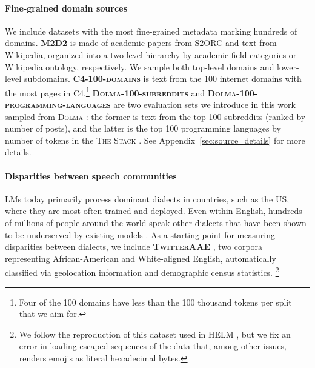 \paragraph{Fine-grained domain sources} We include datasets with the most fine-grained metadata marking hundreds of domains.
\textbf{\textsc{M2D2}} \citep{reid-etal-2022-m2d2} is made of academic papers from S2ORC \citep{lo-etal-2020-s2orc} and text from Wikipedia, organized into a two-level hierarchy by academic field categories or Wikipedia ontology, respectively. We sample both top-level domains and lower-level subdomains. 
\textbf{\textsc{C4-100-domains}} \citep{chronopoulou-etal-2022-efficient} is text from the 100 internet domains with the most pages in \textsc{C4}.\footnote{Four of the 100 domains have less than the 100 thousand tokens per split that we aim for.}
\textbf{\textsc{Dolma-100-subreddits}} and \textbf{\textsc{Dolma-100-programming-languages}} are two evaluation sets we introduce in this work sampled from \textsc{Dolma} \citep{dolma}: the former is text from the top 100 subreddits (ranked by number of posts), and the latter is the top 100 programming languages by number of tokens in the \textsc{The Stack} \citep{Kocetkov2022TheStack}. See Appendix~\ref{sec:source_details} for more details.

\paragraph{Disparities between speech communities} LMs today primarily process dominant dialects in countries, such as the US, where they are most often trained and deployed. Even within English, hundreds of millions of people around the world speak other dialects that have been shown to be underserved by existing models \citep{blodgett-etal-2016-demographic}. As a starting point for measuring disparities between dialects, we include
\textbf{\textsc{TwitterAAE}} \citep{blodgett-etal-2016-demographic}, two corpora representing African-American and White-aligned English, automatically classified via geolocation information and demographic census statistics. \footnote{We follow the reproduction of this dataset used in HELM \citep{Liang2022HolisticEO}, but we fix an error in loading escaped sequences of the data that, among other issues, renders emojis as literal hexadecimal bytes.}

